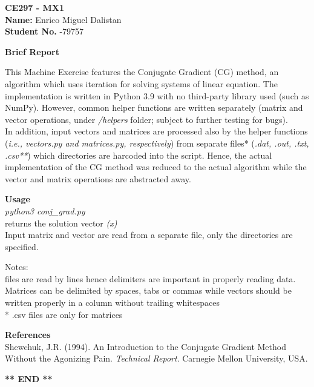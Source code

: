 \documentclass[12pt,a4paper]{article}
\begin{document}
\noindent \textbf{CE297 - MX1} \\
\textbf{Name:} \noindent Enrico Miguel Dalistan \\
\textbf{Student No.} -79757\\

\bigskip
\bigskip
\bigskip

\noindent \textbf{Brief Report}\\

\bigskip

\noindent This Machine Exercise features the Conjugate Gradient (CG) method,
an algorithm which uses iteration for solving systems of linear equation.
The implementation is written in Python 3.9 with no third-party library used
(such as NumPy). However, common helper functions are written separately
(matrix and vector operations, under \textit{/helpers} folder;
subject to further testing for bugs).\\

\noindent In addition, input vectors and matrices are processed also by the helper
functions (\textit{i.e., vectors.py and matrices.py, respectively}) from separate files*
(\textit{.dat, .out, .txt, .csv**}) which directories are harcoded into the script.
Hence, the actual implementation of the CG method was reduced to the actual algorithm
while the vector and matrix operations are abstracted away.\\

\bigskip

\noindent \textbf{Usage}\\

\noindent \textit{python3 conj\_grad.py}\\
\noindent returns the solution vector \textit{(x)}\\

\noindent Input matrix and vector are read from a separate file, only the directories
are specified.\\

\bigskip

\noindent Notes:\\
\noindent * files are read by lines hence delimiters are important in properly reading data.
Matrices can be delimited by spaces, tabs or commas while vectors should be written properly
in a column without trailing whitespaces\\
\noindent ** .csv files are only for matrices

\bigskip

\noindent \textbf{References}\\

\noindent [1] Shewchuk, J.R. (1994). An Introduction to the Conjugate Gradient Method Without the Agonizing Pain.
\textit{Technical Report}. Carnegie Mellon University, USA.

\bigskip
\bigskip
\bigskip

\begin{center}
    \textbf{** END **}
\end{center}
\end{document}
